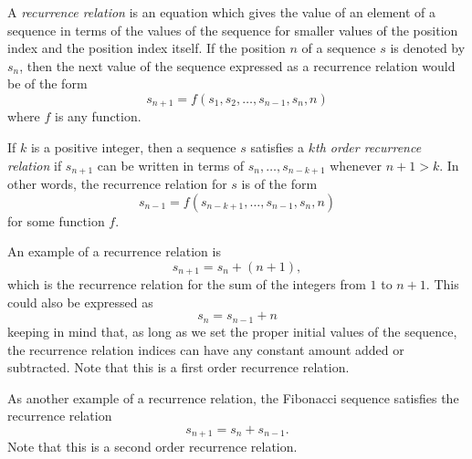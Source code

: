 \documentclass[12pt]{article}
\begin{document}

A \emph{recurrence relation} is an equation which gives the value of an element of a sequence in terms of the values of the sequence for smaller values of the position index and the position index itself.  If the  position $n$ of a sequence $s$ is denoted by $s_n$, then the next value of the sequence expressed as a recurrence relation would be of the form
$$ s_{n+1} = f(s_1,s_2,\ldots,s_{n-1},s_n,n) $$
where $f$ is any function.

If $k$ is a positive integer, then a sequence $s$ satisfies a \emph{$k$th order recurrence relation} if $s_{n+1}$ can be written in terms of $s_n,\dots,s_{n-k+1}$ whenever $n+1>k$.  In other words, the recurrence relation for $s$ is of the form
$$ s_{n-1} = f(s_{n-k+1},\dots,s_{n-1},s_n,n) $$
for some function $f$.

An example of a  recurrence relation is
$$ s_{n+1} = s_n + (n+1), $$
which is the recurrence relation for the sum of the integers from $1$ to $n+1$.  This could also be expressed as 
$$ s_n = s_{n-1} + n $$
keeping in mind that, as long as we set the proper initial values of the sequence, the recurrence relation indices can have any constant amount added or subtracted.  Note that this is a first order recurrence relation.

As another example of a recurrence relation, the Fibonacci sequence satisfies the recurrence relation
$$ s_{n+1} = s_n + s_{n-1}. $$
Note that this is a second order recurrence relation.
\end{document}
